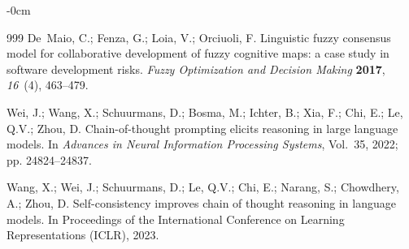 \documentclass[smartcities,article,submit,moreauthors]{Definitions/mdpi}
\begin{document}
\begin{adjustwidth}{-\extralength}{0cm}
\begin{thebibliography}{999}
De~Maio, C.; Fenza, G.; Loia, V.; Orciuoli, F. Linguistic fuzzy consensus
model for collaborative development of fuzzy cognitive maps: a case study in
software development risks. \emph{Fuzzy Optimization and Decision Making}
\textbf{2017}, \emph{16}~(4), 463--479.

Wei, J.; Wang, X.; Schuurmans, D.; Bosma, M.; Ichter, B.; Xia, F.; Chi, E.;
Le, Q.V.; Zhou, D. Chain-of-thought prompting elicits reasoning in large
language models. In \emph{Advances in Neural Information Processing Systems},
Vol.~35, 2022; pp. 24824--24837.

Wang, X.; Wei, J.; Schuurmans, D.; Le, Q.V.; Chi, E.; Narang, S.; Chowdhery,
A.; Zhou, D. Self-consistency improves chain of thought reasoning in language
models. In Proceedings of the International Conference on Learning
Representations (ICLR), 2023.

\end{thebibliography}

\PublishersNote{}
\end{adjustwidth}
\end{document}
